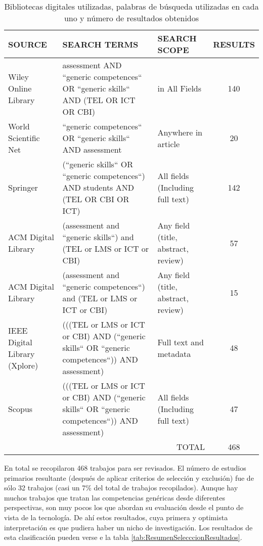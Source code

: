 
\begin{table}[H]
  \begin{center}
  \begin{tabular}{| m{3.5cm} | m{6cm} | m{3cm} | c |}
    \hline
    SOURCE & SEARCH TERMS & SEARCH SCOPE & RESULTS\\
    \hline
    \hline
    Wiley Online Library & assessment AND ``generic competences`` OR ``generic skills`` AND (TEL OR ICT OR CBI) & in All Fields & 140 \\
    \hline
    World Scientific Net & ``generic competences`` OR ``generic skills`` AND assessment & Anywhere in article & 20\\
    \hline
    Springer & (``generic skills`` OR ``generic competences``) AND  students AND (TEL OR CBI OR ICT) & All fields (Including full text) & 142\\
    \hline
    ACM Digital Library & (assessment and ``generic skills``) and (TEL or LMS or ICT or CBI) & Any field (title, abstract, review) & 57\\
    \hline
    ACM Digital Library & (assessment and ``generic competences``) and (TEL or LMS or ICT or CBI) & Any field (title, abstract, review) & 15\\
    \hline
    IEEE Digital Library (Xplore) & (((TEL or LMS or ICT or CBI) AND (``generic skills`` OR ``generic competences``)) AND assessment) & Full text and metadata & 48\\
    \hline
    Scopus & (((TEL or LMS or ICT or CBI) AND (``generic skills`` OR ``generic competences``)) AND assessment) & All fields (Including full text) & 47\\
    \hline
    \multicolumn{3}{|r|}{TOTAL} & 468\\
    \hline
  \end{tabular}
\end{center}
\caption{Bibliotecas digitales utilizadas, palabras de búsqueda utilizadas en cada uno y número de resultados obtenidos}
\label{tab:ResumenBusquedaResultados}
\end{table} 



En total se recopilaron 468 trabajos para ser revisados. El número de estudios primarios resultante (después de aplicar criterios de selección y exclusión) fue de sólo 32 trabajos (casi un 7\% del total de trabajos recopilados). Aunque hay muchos trabajos que tratan las competencias genéricas desde diferentes perspectivas, son muy pocos los que abordan su evaluación desde el punto de vista de la tecnología. De ahí estos resultados, cuya primera y optimista interpretación es que pudiera haber un nicho de investigación. Los resultados de esta clasificación pueden verse e la tabla \ref{tab:ResumenSelecccionResultados}.

